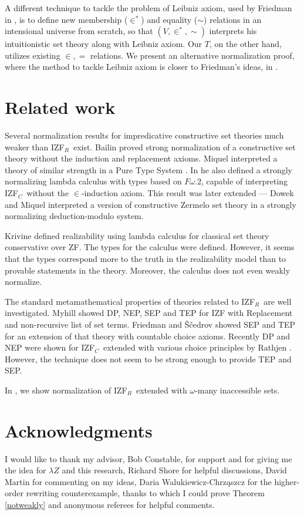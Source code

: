 \documentclass{LMCS}
\newcommand{\izfc}{IZF${}_C$}
\newcommand{\izfr}{IZF${}_R$}
\newcommand{\li}{\lambda Z}
\begin{document}
A different technique to tackle the problem of Leibniz axiom, used by Friedman in \cite{friedmancons}, 
is to define new membership ($\in^*$) and equality ($\sim$) relations in an intensional universe from scratch, so that $(V,
\in^*, \sim)$ interprets his intuitionistic set theory along with 
Leibniz axiom. Our $T$, on the other hand, utilizes existing $\in, =$ relations.
We present an alternative normalization proof, where the method to
tackle Leibniz axiom is closer to Friedman's ideas, in \cite{jatrinac2006}.

\section{Related work}\label{others}

Several normalization results for impredicative constructive set theories
much weaker than \izfr\ exist. Bailin
\cite{bailin88} proved  strong normalization of a constructive set theory
without the induction and replacement axioms. Miquel 
interpreted a theory of similar strength in a Pure Type System
\cite{miquelpts}. In \cite{miquel} he also defined a strongly normalizing
lambda calculus with types based on $F\omega.2$,
capable of interpreting \izfc\ without the $\in$-induction axiom. This result was
later extended --- Dowek and Miquel \cite{dowek} interpreted a version of constructive
Zermelo set theory in a strongly normalizing deduction-modulo system.

Krivine \cite{krivine} defined realizability using lambda calculus for classical set theory conservative
over ZF. The types for the calculus were defined. However, it seems that the types
correspond more to the truth in the realizability model than to provable
statements in the theory. Moreover, the calculus does not even weakly normalize.

The standard metamathematical properties of theories related to \izfr\ are well investigated.
Myhill \cite{myhill72} showed DP, NEP, SEP and TEP for IZF with Replacement and
non-recursive list of set terms. Friedman and \^S\^cedrov \cite{frsce1} showed SEP and
TEP for an extension of that theory with countable choice
axioms. Recently DP and NEP were shown for \izfc\ extended with various choice principles by Rathjen \cite{rathjenizf}.
However, the technique does not seem to be strong enough to provide TEP and SEP.

In \cite{jatrinac2006}, we show normalization of \izfr\ extended with
$\omega$-many inaccessible sets.

\section*{Acknowledgments}

I would like to thank my advisor, Bob Constable, for support and for
giving me the idea for $\li$ and this research, Richard Shore for
helpful discussions, David Martin for commenting on my ideas, Daria
Walukiewicz-Chrz{\selectfont\k a}szcz for the
higher-order rewriting counterexample, thanks to which I could prove
Theorem \ref{notweakly} and anonymous referees for helpful comments.
 
\end{document}
